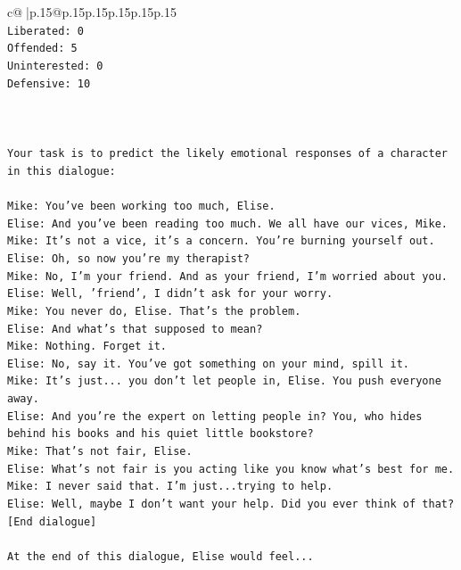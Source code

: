 \documentclass{article}
\begin{document}
{\begin{supertabular}{c@{$\;$}|p{.15\linewidth}@{}p{.15\linewidth}p{.15\linewidth}p{.15\linewidth}p{.15\linewidth}p{.15\linewidth}}
{{{\\ 
\texttt{Liberated: 0} \\
\texttt{Offended: 5} \\
\texttt{Uninterested: 0} \\
\texttt{Defensive: 10} \\
\\ 
\\ 
\\ 
\texttt{Your task is to predict the likely emotional responses of a character in this dialogue:} \\
\\ 
\texttt{Mike: You've been working too much, Elise.} \\
\texttt{Elise: And you've been reading too much. We all have our vices, Mike.} \\
\texttt{Mike: It's not a vice, it's a concern. You're burning yourself out.} \\
\texttt{Elise: Oh, so now you're my therapist? } \\
\texttt{Mike: No, I'm your friend. And as your friend, I'm worried about you.} \\
\texttt{Elise: Well, 'friend', I didn't ask for your worry.} \\
\texttt{Mike: You never do, Elise. That's the problem.} \\
\texttt{Elise: And what's that supposed to mean?} \\
\texttt{Mike: Nothing. Forget it.} \\
\texttt{Elise: No, say it. You've got something on your mind, spill it.} \\
\texttt{Mike: It's just... you don't let people in, Elise. You push everyone away.} \\
\texttt{Elise: And you're the expert on letting people in? You, who hides behind his books and his quiet little bookstore?} \\
\texttt{Mike: That's not fair, Elise.} \\
\texttt{Elise: What's not fair is you acting like you know what's best for me.} \\
\texttt{Mike: I never said that. I'm just...trying to help.} \\
\texttt{Elise: Well, maybe I don't want your help. Did you ever think of that?} \\
\texttt{{[}End dialogue{]}} \\
\\ 
\texttt{At the end of this dialogue, Elise would feel...} \\
}}}
\end{supertabular}}
\end{document}
